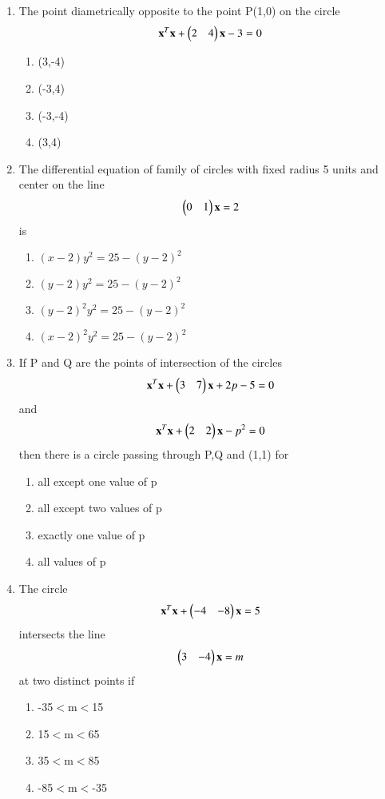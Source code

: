 \begin{enumerate}[label=\arabic*.,ref=\thesubsection.\theenumi]
\item The point diametrically opposite to the point P(1,0) on the circle 
\begin{align}
\mathbf x^T\mathbf x+\begin{pmatrix}2&4\end{pmatrix}\mathbf x-3=0
\end{align}
\begin{enumerate}
\item (3,-4)
\item (-3,4)
\item (-3,-4)
\item (3,4)
\end{enumerate}

\item The differential equation of family of circles with fixed radius 5 units and center on the line \begin{align}
\begin{pmatrix}0&1\end{pmatrix}\mathbf x=2
\end{align} 
is
\begin{enumerate}
\item $(x-2)y^2=25-(y-2)^2$
\item $(y-2)y^2=25-(y-2)^2$
\item $(y-2)^2y^2=25-(y-2)^2$
\item $(x-2)^2y^2=25-(y-2)^2$
\end{enumerate}
    
\item If P and Q are the points of intersection of the circles 
\begin{align}
\mathbf x^T\mathbf x+\begin{pmatrix}3&7\end{pmatrix}\mathbf x+2p-5=0
\end{align} 
and 
\begin{align}
\mathbf x^T\mathbf x+\begin{pmatrix}2&2\end{pmatrix}\mathbf x-p^2=0
\end{align} 
then there is a circle passing through P,Q and (1,1) for
\begin{enumerate}    
\item all except one value of p
\item all except two values of p
\item exactly one value of p
\item all values of p
\end{enumerate}

\item The circle 
\begin{align}
\mathbf x^T\mathbf x+\begin{pmatrix}-4&-8\end{pmatrix}\mathbf x=5
\end{align} 
intersects the line 
\begin{align}
\begin{pmatrix}3&-4\end{pmatrix}\mathbf x=m
\end{align} 
at two distinct points if
\begin{enumerate}    
\item -35$<$m$<$15
\item 15$<$m$<$65
\item 35$<$m$<$85
\item -85$<$m$<$-35
\end{enumerate}


\end{enumerate}
